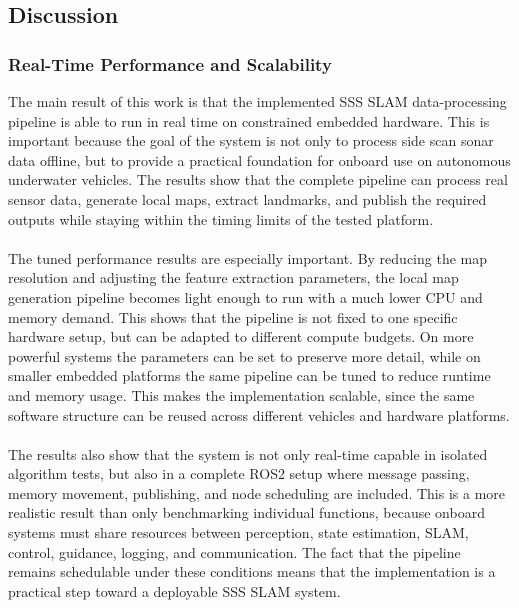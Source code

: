 \subsection{Discussion}
\subsubsection{Real-Time Performance and Scalability}
The main result of this work is that the implemented SSS SLAM data-processing pipeline is able to run in real time on constrained embedded hardware. This is important because the goal of the system is not only to process side scan sonar data offline, but to provide a practical foundation for onboard use on autonomous underwater vehicles. The results show that the complete pipeline can process real sensor data, generate local maps, extract landmarks, and publish the required outputs while staying within the timing limits of the tested platform.
\\ \\
The tuned performance results are especially important. By reducing the map resolution and adjusting the feature extraction parameters, the local map generation pipeline becomes light enough to run with a much lower CPU and memory demand. This shows that the pipeline is not fixed to one specific hardware setup, but can be adapted to different compute budgets. On more powerful systems the parameters can be set to preserve more detail, while on smaller embedded platforms the same pipeline can be tuned to reduce runtime and memory usage. This makes the implementation scalable, since the same software structure can be reused across different vehicles and hardware platforms.
\\ \\
The results also show that the system is not only real-time capable in isolated algorithm tests, but also in a complete ROS2 setup where message passing, memory movement, publishing, and node scheduling are included. This is a more realistic result than only benchmarking individual functions, because onboard systems must share resources between perception, state estimation, SLAM, control, guidance, logging, and communication. The fact that the pipeline remains schedulable under these conditions means that the implementation is a practical step toward a deployable SSS SLAM system.


